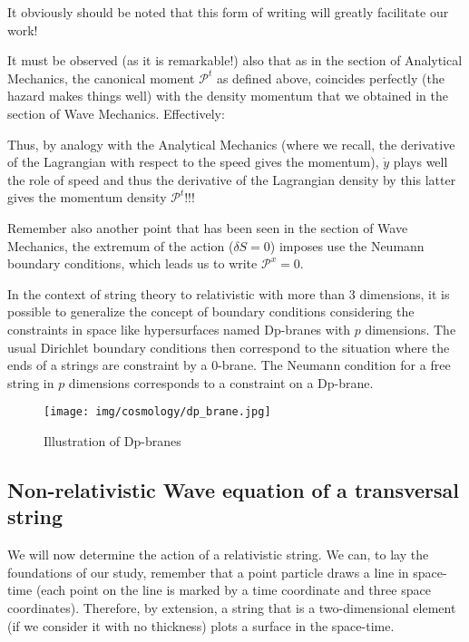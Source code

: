 	\begin{tcolorbox}[title=Remark,colframe=black,arc=10pt]
	It obviously should be noted that this form of writing will greatly facilitate our work!
	\end{tcolorbox}
	It must be observed (as it is remarkable!) also that as in the section of Analytical Mechanics, the canonical moment $\mathcal{P}^t$ as defined above, coincides perfectly (the hazard makes things well) with the density momentum that we obtained in the section of Wave Mechanics. Effectively:
	
	Thus, by analogy with the Analytical Mechanics (where we recall, the derivative of the Lagrangian with respect to the speed gives the momentum), $\dot{y}$ plays well the role of speed and thus the derivative of the Lagrangian density by this latter gives the momentum density $\mathcal{P}^t$!!!
	
	Remember also another point that has been seen in the section of Wave Mechanics, the extremum of the action ($\delta S=0$) imposes use the Neumann boundary conditions, which leads us to write $\mathcal{P}^x=0$.
	\begin{tcolorbox}[title=Remark,colframe=black,arc=10pt]
	In the context of string theory to relativistic with more than 3 dimensions, it is possible to generalize the concept of boundary conditions considering the constraints in space like hypersurfaces named Dp-branes with $p$ dimensions. The usual Dirichlet boundary conditions then correspond to the situation where the ends of a strings are constraint by a 0-brane. The Neumann condition for a free string in $p$ dimensions corresponds to a constraint on a Dp-brane.
	\begin{figure}[H]
		\centering
		\texttt{[image: img/cosmology/dp\_brane.jpg]}	
		\caption[]{Illustration of Dp-branes}
	\end{figure}
	\end{tcolorbox}
	
	\subsection{Non-relativistic Wave equation of a transversal string}
	We will now determine the action of a relativistic string. We can, to lay the foundations of our study, remember that a point particle draws a line in space-time (each point on the line is marked by a time coordinate and three space coordinates). Therefore, by extension, a string that is a two-dimensional element (if we consider it with no thickness) plots a surface in the space-time.
	
